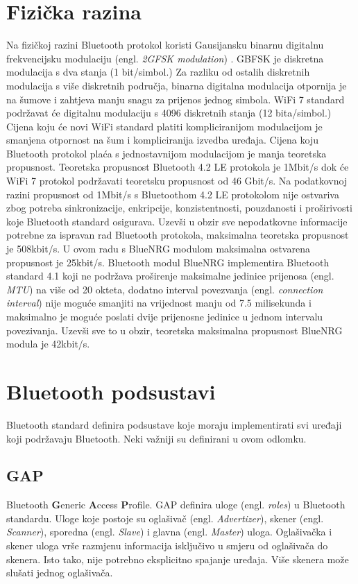 \documentclass[times, utf8, diplomski]{diplomski}
\begin{document}
\section {Fizička razina}
Na fizičkoj razini Bluetooth protokol koristi Gausijansku binarnu digitalnu frekvencijsku modulaciju (engl. \textit{2GFSK modulation}) \cite{GBFSK}.
GBFSK je diskretna modulacija s dva stanja (1 bit/simbol.)
Za razliku od ostalih diskretnih modulacija s više diskretnih područja, binarna digitalna modulacija otpornija je na šumove i zahtjeva manju snagu za prijenos jednog simbola.
WiFi 7 standard podržavat će digitalnu modulaciju s 4096 diskretnih stanja \cite{wifimax} (12 bita/simbol.)
Cijena koju će novi WiFi standard platiti kompliciranijom modulacijom je smanjena otpornost na šum i kompliciranija izvedba uređaja.
Cijena koju Bluetooth protokol plaća s jednostavnijom modulacijom je manja teoretska propusnost.
Teoretska propusnost Bluetooth 4.2 LE protokola je 1Mbit/s \cite{maxtrough} dok će WiFi 7 protokol podržavati teoretsku propusnost od 46 Gbit/s.
Na podatkovnoj razini propusnost od 1Mbit/s s Bluetoothom 4.2 LE protokolom nije ostvariva zbog potreba sinkronizacije, enkripcije, konzistentnosti, pouzdanosti i proširivosti koje Bluetooth standard osigurava.
Uzevši u obzir sve nepodatkovne informacije potrebne za ispravan rad Bluetooth protokola, maksimalna teoretska propusnost je 508kbit/s.
U ovom radu s BlueNRG modulom maksimalna ostvarena propusnost je 25kbit/s.
Bluetooth modul BlueNRG implementira Bluetooth standard 4.1 koji ne podržava proširenje maksimalne jedinice prijenosa (engl. \textit{MTU}) na više od 20 okteta, dodatno interval povezvanja (engl. \textit{connection interval}) nije moguće smanjiti na vrijednost manju od 7.5 milisekunda i maksimalno je moguće poslati dvije prijenosne jedinice u jednom intervalu povezivanja.
Uzevši sve to u obzir, teoretska maksimalna propusnost BlueNRG modula je 42kbit/s.

\section{Bluetooth podsustavi}
Bluetooth standard definira podsustave koje moraju implementirati svi uređaji koji podržavaju Bluetooth. Neki važniji su definirani u ovom odlomku.

\subsection{GAP}
Bluetooth \textbf{G}eneric \textbf{A}ccess \textbf{P}rofile.
GAP definira uloge (engl. \textit{roles}) u Bluetooth standardu. Uloge koje postoje su oglašivač (engl. \textit{Advertizer}), skener (engl. \textit{Scanner}), sporedna (engl. \textit{Slave}) i glavna (engl. \textit{Master}) uloga. Oglašivačka i skener uloga vrše razmjenu informacija isključivo u smjeru od oglašivača do skenera. Isto tako, nije potrebno eksplicitno spajanje uređaja.
Više skenera može slušati jednog oglašivača.
\end{document}
